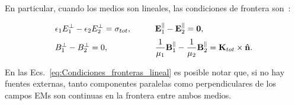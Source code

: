 En particular, cuando los medios son lineales, las condiciones de frontera son~\cite{griffiths2013electrodynamics}:
\begin{tcolorbox}[title = Condiciones de frontera para materiales lineales]
	\begin{equation}
	\begin{aligned}
	&\epsilon_{1}E_{1}^{\perp}-\epsilon_{2}E_{2}^{\perp}=\sigma_{tot},&\qquad&\vb{E}_{1}^{\parallel}-\vb{E}_{2}^{\parallel}=\vb{0},\\[2pt]
	&B_{1}^{\perp}-B_{2}^{\perp}=0,&\qquad& \frac{1}{\mu_{1}}\vb{B}^{\parallel}_{1}-\frac{1}{\mu_{2}}\vb{B}^{\parallel}_{2}=\vb{K}_{tot}\times\vu{n}.
	\end{aligned}\label{eq:Condiciones_fronteras_lineal}
	\end{equation}
\end{tcolorbox}
\noindent En las Ecs.~\eqref{eq:Condiciones_fronteras_lineal} es posible notar que, si no hay fuentes externas, tanto componentes paralelas como perpendiculares de los campos EMs son continuas en la frontera entre ambos medios.

